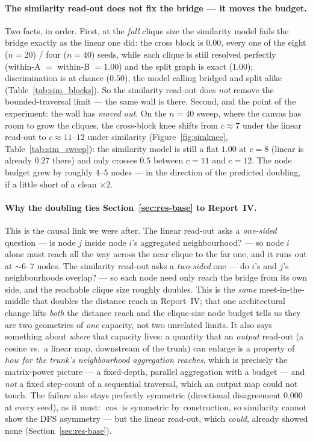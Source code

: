 \documentclass[11pt,a4paper]{article}
\begin{document}
\paragraph{The similarity read-out does not fix the bridge --- it moves the budget.} Two facts,
in order. First, at the \emph{full} clique size the similarity model fails the bridge exactly as
the linear one did: the cross block is $0.00$, every one of the eight ($n=20$) / four ($n=40$)
seeds, while each clique is still resolved perfectly (within-A $=$ within-B $=1.00$) and the split
graph is exact ($1.00$); discrimination is at chance ($0.50$), the model calling bridged and split
alike (Table~\ref{tab:sim_blocks}). So the similarity read-out does \emph{not} remove the
bounded-traversal limit --- the same wall is there. Second, and the point of the experiment: the
wall has \emph{moved out}. On the $n=40$ sweep, where the canvas has room to grow the cliques, the
cross-block knee shifts from $c\approx7$ under the linear read-out to $c\approx11$--$12$ under
similarity (Figure~\ref{fig:simknee}, Table~\ref{tab:sim_sweep}): the similarity model is still a
flat $1.00$ at $c=8$ (linear is already $0.27$ there) and only crosses $0.5$ between $c=11$ and
$c=12$. The node budget grew by roughly $4$--$5$ nodes --- in the direction of the predicted
doubling, if a little short of a clean $\times2$.

\paragraph{Why the doubling ties Section~\ref{sec:res-base} to Report~IV.} This is the causal link
we were after. The linear read-out asks a \emph{one-sided} question --- is node $j$ inside node
$i$'s aggregated neighbourhood? --- so node $i$ alone must reach all the way across the near clique
to the far one, and it runs out at $\sim6$--$7$ nodes. The similarity read-out asks a
\emph{two-sided} one --- do $i$'s and $j$'s neighbourhoods overlap? --- so each node need only reach
the bridge from its own side, and the reachable clique size roughly doubles. This is the \emph{same}
meet-in-the-middle that doubles the distance reach in Report~IV; that one architectural change lifts
\emph{both} the distance reach and the clique-size node budget tells us they are two geometries of
\emph{one} capacity, not two unrelated limits. It also says something about \emph{where} that
capacity lives: a quantity that an \emph{output} read-out (a cosine vs.\ a linear map, downstream of
the trunk) can enlarge is a property of \emph{how far the trunk's neighbourhood aggregation reaches},
which is precisely the matrix-power picture --- a fixed-depth, parallel aggregation with a budget ---
and \emph{not} a fixed step-count of a sequential traversal, which an output map could not touch. The
failure also stays perfectly symmetric (directional disagreement $0.000$ at every seed), as it must:
$\cos$ is symmetric by construction, so similarity cannot show the DFS asymmetry --- but the linear
read-out, which \emph{could}, already showed none (Section~\ref{sec:res-base}).
\end{document}
